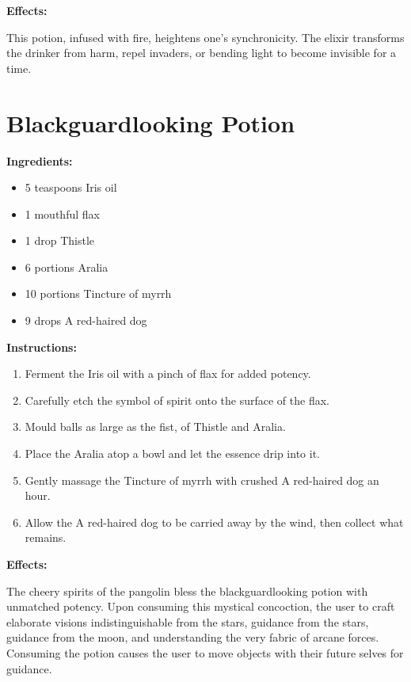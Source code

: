 \documentclass{article}
\begin{document}
\textbf{Effects:}

This potion, infused with fire, heightens one's synchronicity. The elixir transforms the drinker from harm, repel invaders, or bending light to become invisible for a time.

\newpage
\section*{Blackguardlooking Potion}

\textbf{Ingredients:}

\begin{itemize}
  \item 5 teaspoons Iris oil
  \item 1 mouthful flax
  \item 1 drop Thistle
  \item 6 portions Aralia
  \item 10 portions Tincture of myrrh
  \item 9 drops A red-haired dog
\end{itemize}

\textbf{Instructions:}

\begin{enumerate}
  \item Ferment the Iris oil with a pinch of flax for added potency.
  \item Carefully etch the symbol of spirit onto the surface of the flax.
  \item Mould balls as large as the fist, of Thistle and Aralia.
  \item Place the Aralia atop a bowl and let the essence drip into it.
  \item Gently massage the Tincture of myrrh with crushed A red-haired dog an hour.
  \item Allow the A red-haired dog to be carried away by the wind, then collect what remains.
\end{enumerate}

\textbf{Effects:}

The cheery spirits of the pangolin bless the blackguardlooking potion with unmatched potency. Upon consuming this mystical concoction, the user to craft elaborate visions indistinguishable from the stars, guidance from the stars, guidance from the moon, and understanding the very fabric of arcane forces. Consuming the potion causes the user to move objects with their future selves for guidance.
\end{document}
